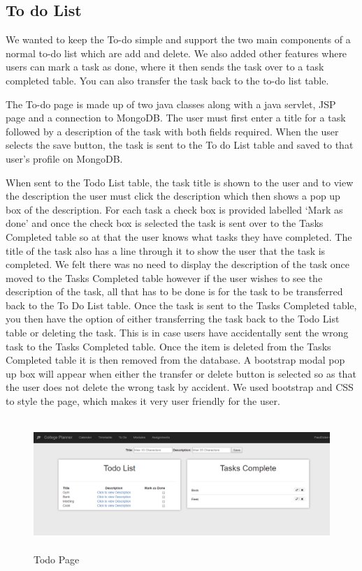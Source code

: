 \subsection{To do List}
We wanted to keep the To-do simple and support the two main components of a normal to-do list which are add and delete. We also added other features where users can mark a task as done, where it then sends the task over to a task completed table. You can also transfer the task back to the to-do list table.

\par The To-do page is made up of two java classes along with a java servlet, JSP page and a connection to MongoDB. The user must first enter a title for a task followed by a description of the task with both fields required. When the user selects the save button, the task is sent to the To do List table and saved to that user’s profile on MongoDB.

\par When sent to the Todo List table, the task title is shown to the user and to view the description the user must click the description which then shows a pop up box of the description. For each task a check box is provided labelled ‘Mark as done’ and once the check box is selected the task is sent over to the Tasks Completed table so at that the user knows what tasks they have completed. The title of the task also has a line through it to show the user that the task is completed. We felt there was no need to display the description of the task once moved to the Tasks Completed table however if the user wishes to see the description of the task, all that has to be done is for the task to be transferred back to the To Do List table.  Once the task is sent to the Tasks Completed table, you then have the option of either transferring the task back to the Todo List table or deleting the task. This is in case users have accidentally sent the wrong task to the Tasks Completed table. Once the item is deleted from the Tasks Completed table it is then removed from the database. A bootstrap modal pop up box will appear when either the transfer or delete button is selected so as that the user does not delete the wrong task by accident. We used bootstrap and CSS to style the page, which makes it very user friendly for the user.

 


\begin{figure}[h]
\centering
\includegraphics[width=13cm, height=5cm]{img/ToDo}
\caption{Todo Page}
\end{figure}


